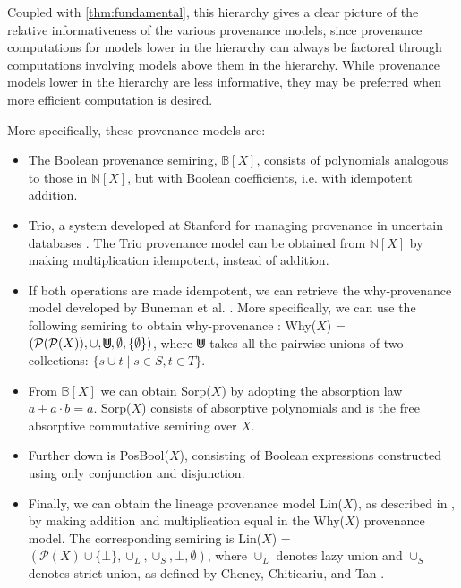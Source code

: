 \documentclass[oneside, 11pt]{amsbook}
\theoremstyle{plain}
\theoremstyle{definition}
\theoremstyle{remark}
\newcommand{\cupcup}{
  \mathbin{
    \tikz[baseline=-0.5ex, line width=0.8pt]{
      \draw (0,0) arc (180:360:0.6ex);
      \draw (0,0) -- (0,1.1ex);
      \draw (1.2ex,0) -- (1.2ex,1.1ex);

      \draw (0.3ex,0.15ex) arc (180:360:0.3ex);
      \draw (0.3ex,0.15ex) -- (0.3ex,1.0ex);
      \draw (0.9ex,0.15ex) -- (0.9ex,1.0ex);
    }
  }
}
\begin{document}
Coupled with \autoref{thm:fundamental}, this hierarchy gives a clear picture of the relative informativeness of the various provenance models, since provenance computations for models lower in the hierarchy can always be factored through computations involving models above them in the hierarchy. While provenance models lower in the hierarchy are less informative, they may be preferred when more efficient computation is desired.

More specifically, these provenance models are:

\begin{itemize}
    \item The Boolean provenance semiring, $\mathbb{B}[X]$, consists of polynomials analogous to those in $\mathbb{N}[X]$, but with Boolean coefficients, i.e. with idempotent addition.
    \item Trio, a system developed at Stanford for managing provenance in uncertain databases \cite{Benjelloun2008}. The Trio provenance model can be obtained from $\mathbb{N}[X]$ by making multiplication idempotent, instead of addition.
    \item If both operations are made idempotent, we can retrieve the why-provenance model developed by Buneman et al. \cite{Buneman2001}. More specifically, we can use the following semiring to obtain why-provenance \cite{Cheney2009}: Why($X$) = $(\mathcal{P}(\mathcal{P}(X)), \cup, \cupcup, \emptyset, \{\emptyset\})$, where $\cupcup$ takes all the pairwise unions of two collections: $\{s \cup t \mid s \in S, t \in T \}$.
    \item From $\mathbb{B}[X]$ we can obtain Sorp($X$) by adopting the absorption law $a + a \cdot b = a$. Sorp($X$) consists of absorptive polynomials and is the free absorptive commutative semiring over $X$.
    \item Further down is PosBool($X$), consisting of Boolean expressions constructed using only conjunction and disjunction.
    \item Finally, we can obtain the lineage provenance model Lin($X$), as described in \cite{Cui2000}, by making addition and multiplication equal in the Why($X$) provenance model. The corresponding semiring is Lin($X$) = $(\mathcal{P}(X) \cup \{\bot\}, \cup_L, \cup_S, \bot, \emptyset)$, where $\cup_L$ denotes lazy union and $\cup_S$ denotes strict union, as defined by Cheney, Chiticariu, and Tan \cite{Cheney2009}.
\end{itemize}
\end{document}
